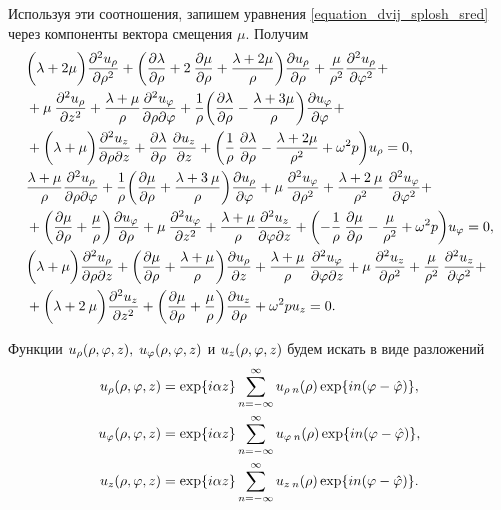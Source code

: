 Используя эти соотношения, запишем уравнения \eqref{equation_dvij_splosh_sred} через компоненты вектора смещения $\mu.$ Получим
\begin{equation}\label{equation_otn_u}
\begin{aligned}
&\biggl(\lambda+2\mu\biggr)\frac{\partial^2u_{\rho}}{\partial \rho^2}+\biggl(\frac{\partial\lambda}{\partial \rho}+2\:\frac{\partial\mu}{\partial \rho}+\frac{\lambda+2\mu}{\rho}\biggr)\frac{\partial u_{\rho}}{\partial \rho}+\frac{\mu}{\rho^2}\frac{\partial^2 u_{\rho}}{\partial \varphi^2}+\\
&+\mu\:\frac{\partial^2 u_{\rho}}{\partial z^2}+\frac{\lambda+\mu}{\rho}\frac{\partial^2 u_{\varphi}}{\partial \rho\partial\varphi}+\frac{1}{\rho}\biggl(\frac{\partial\lambda}{\partial \rho}-\frac{\lambda+3\mu}{\rho}\biggr)\frac{\partial u_{\varphi}}{\partial\varphi}+\\
&+\biggl(\lambda+\mu\biggr)\frac{\partial^2 u_z}{\partial \rho\partial z}+\frac{\partial\lambda}{\partial \rho}\:\frac{\partial u_z}{\partial z}+\biggl(\frac{1}{\rho}\:\frac{\partial\lambda}{\partial \rho}-\frac{\lambda+2\mu}{\rho^2}+\omega^2 p\biggr)u_{\rho}=0,\\
&\frac{\lambda+\mu}{\rho}\frac{\partial^2u_{\rho}}{\partial \rho\partial\varphi}+\frac{1}{\rho}\biggl(\frac{\partial\mu}{\partial \rho}+\frac{\lambda+3\:\mu}{\rho}\biggr)\frac{\partial u_{\rho}}{\partial\varphi}+\mu\:\frac{\partial^2 u_{\varphi}}{\partial \rho^2}+\frac{\lambda+2\:\mu}{\rho^2}\:\frac{\partial^2 u_{\varphi}}{\partial \varphi^2}+\\
&+\biggl(\frac{\partial\mu}{\partial \rho}+\frac{\mu}{\rho}\biggr)\frac{\partial u_{\varphi}}{\partial \rho}+\mu\:\frac{\partial^2 u_{\varphi}}{\partial z^2}+\frac{\lambda+\mu}{\rho}\frac{\partial^2 u_z}{\partial \varphi\partial z}+\biggl(-\frac{1}{\rho}\:\frac{\partial\mu}{\partial \rho}-\frac{\mu}{\rho^2}+\omega^2 p\biggr)u_{\varphi}=0,\\
&\biggl(\lambda+\mu\biggr)\frac{\partial^2u_{\rho}}{\partial \rho\partial z}+\biggl(\frac{\partial\mu}{\partial \rho}+\frac{\lambda+\mu}{\rho}\biggr)\frac{\partial u_{\rho}}{\partial z}+\frac{\lambda+\mu}{\rho}\:\frac{\partial^2 u_{\varphi}}{\partial \varphi\partial z}+\mu\:\frac{\partial^2 u_z}{\partial \rho^2}+\frac{\mu}{\rho^2}\:\frac{\partial^2 u_z}{\partial {\varphi}^2}+\\
&+\biggl(\lambda+2\:\mu\biggr)\frac{\partial^2 u_z}{\partial z^2}+\biggl(\frac{\partial\mu}{\partial \rho}+\frac{\mu}{\rho}\biggr)\frac{\partial u_z}{\partial \rho}+\omega^2 pu_z=0.
\end{aligned}
\end{equation}

Функции $u_\rho(\rho, \varphi, z),$ $u_\varphi(\rho, \varphi, z)$ и $u_z(\rho, \varphi, z)$ будем искать в виде разложений
\begin{equation}\label{razloj_u}
\begin{aligned}
u_\rho(\rho, \varphi, z)&=\exp\{i\alpha z\}\sum_{n=-\infty}^{\infty}u_{\rho\:n}(\rho)\exp\{in(\varphi-\hat{\varphi})\},\\
u_\varphi(\rho, \varphi, z)&=\exp\{i\alpha z\}\sum_{n=-\infty}^{\infty}u_{\varphi\:n}(\rho)\exp\{in(\varphi-\hat{\varphi})\},\\
u_z(\rho, \varphi, z)&=\exp\{i\alpha z\}\sum_{n=-\infty}^{\infty}u_{z\:n}(\rho)\exp\{in(\varphi-\hat{\varphi})\}.
\end{aligned}
\end{equation}

